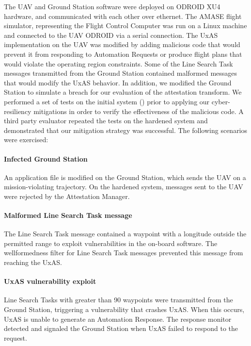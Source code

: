 The UAV and Ground Station software were deployed on ODROID XU4 hardware, and communicated with each other over ethernet.  The AMASE flight simulator, representing the Flight Control Computer was run on a Linux machine and connected to the UAV ODROID via a serial connection.  The UxAS implementation on the UAV was modified by adding malicious code that would prevent it from responding to Automation Requests or produce flight plans that would violate the operating region constraints.  Some of the Line Search Task messages transmitted from the Ground Station contained malformed messages that would modify the UxAS behavior. In addition, we modified the Ground Station to simulate a breach for our evaluation of the attestation transform.
%
We performed a set of tests on the initial system () prior to applying our cyber-resiliency mitigations in order to verify the effectiveness of the malicious code.
A third party evaluator repeated the tests on the hardened system and %
demonstrated that our mitigation strategy was successful.
The following scenarios were exercised:

\paragraph{Infected Ground Station} An application file is modified on the Ground Station, which sends the UAV on a mission-violating trajectory.
On the hardened system, messages sent to the UAV were rejected by the Attestation Manager.

\paragraph{Malformed Line Search Task message} The Line Search Task message contained a waypoint with a longitude outside the permitted range to exploit vulnerabilities in the on-board software.  The wellformedness filter for Line Search Task messages prevented this message from reaching the UxAS.

\paragraph{UxAS vulnerability exploit} Line Search Tasks with greater than 90 waypoints were transmitted from the Ground Station, triggering a vulnerability that crashes UxAS.   When this occurs, UxAS is unable to generate an Automation Response. The response monitor detected and signaled the Ground Station when UxAS failed to respond to the request.

